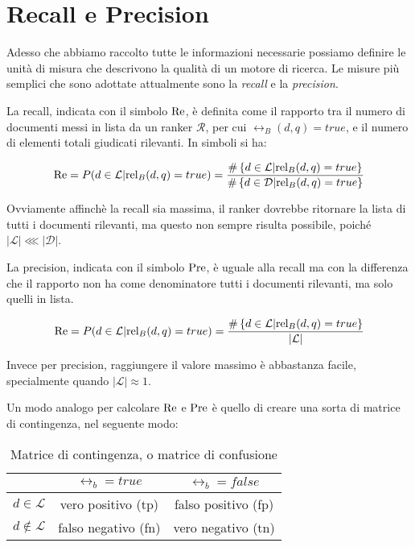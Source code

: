 \section{Recall e Precision}

Adesso che abbiamo raccolto tutte le informazioni necessarie possiamo definire
le unità di misura che descrivono la qualità di un motore di ricerca.
Le misure più semplici che sono adottate attualmente sono  la \textit{recall} e la \textit{precision}.

\begin{definizione}\label{def:recall}
	La recall, indicata con il simbolo $\text{Re}$, è definita come il rapporto tra il numero di documenti
	messi in lista da  un ranker $\mathcal{R}$, per cui $\rel_B(d,q) = true$,
	e il numero di elementi totali giudicati rilevanti.
	In simboli si ha:
	
	$$
	\text{Re} = P(d \in \mathcal{L} | \text{rel}_B(d,q) = true) = \frac{
		\#\left\{ d \in \mathcal{L} | \text{rel}_B(d,q) = true\right\}
	}{
		\#\left\{ d \in \mathcal{D} | \text{rel}_B(d,q) = true\right\}
	}
	$$
\end{definizione}

Ovviamente affinchè la recall sia massima, il ranker dovrebbe ritornare la lista di tutti i documenti
rilevanti, ma questo non sempre risulta possibile, poiché $\left|\mathcal{L}\right| \lll \left|\mathcal{D}\right|$.

\begin{definizione}\label{def:precision}
	La precision, indicata con il simbolo $\text{Pre}$, è uguale alla recall
	ma con la differenza che il rapporto non ha come denominatore tutti i documenti
	rilevanti, ma solo quelli in lista.
	
	$$
	\text{Re} = P(d \in \mathcal{L} | \text{rel}_B(d,q) = true) = \frac{
		\#\left\{ d \in \mathcal{L} | \text{rel}_B(d,q) = true\right\}
	}{
		\left|\mathcal{L}\right|
	}
	$$
\end{definizione}
Invece per precision, raggiungere il valore massimo è abbastanza facile, specialmente quando $\left|\mathcal{L}\right| \approx 1$.

\pagebreak

Un modo analogo per calcolare $\text{Re}$ e $\text{Pre}$ è quello di creare una sorta di matrice di contingenza, nel seguente modo:

\begin{table}[h!]
	\centering
	\begin{tabular}{|c|c|c|}
		\hline
		& $\rel_b = true$ & $\rel_b = false$ \\
		\hline
		$d \in \mathcal{L}$ &  vero positivo (tp) & falso positivo (fp) \\
		\hline
		$d \notin \mathcal{L}$ &  falso negativo (fn) & vero negativo (tn) \\
		\hline
	\end{tabular}
	\caption{Matrice di contingenza, o matrice di confusione}
\end{table}

